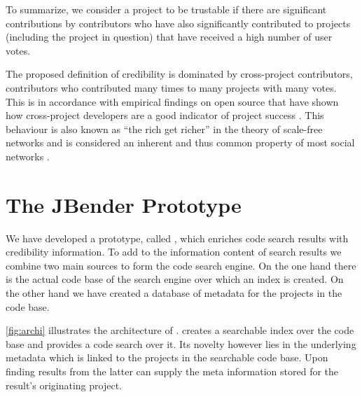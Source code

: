 To summarize, we consider a project to be trustable if there are significant contributions by contributors who have also significantly contributed to projects (including the project in question) that have received a high number of user votes.

The proposed definition of credibility is dominated by cross-project contributors, \ie contributors who contributed many times to many projects with many votes. This is in accordance with empirical findings on open source that have shown how cross-project developers are a good indicator of project success \cite{Kats07a}. This behaviour is also known as ``the rich get richer'' in the theory of scale-free networks and is considered an inherent and thus common property of most social networks \cite{Bara03a}.

\section{The JBender Prototype}
\label{sec:approach}

We have developed a prototype, called \Jbd, which enriches code search results with credibility information. To add to the information content of search results we combine two main sources to form the \Jbd code search engine. On the one hand there is the actual code base of the search engine over which an index is created. On the other hand we have created a database of metadata for the projects in the code base. 

\autoref{fig:archi} illustrates the architecture of \Jbd. \Jbd creates a searchable index over the code base and provides a code search over it. Its novelty however lies in the underlying metadata which is linked to the projects in the searchable code base. Upon finding results from the latter \Jbd can supply the meta information stored for the result's originating project.


